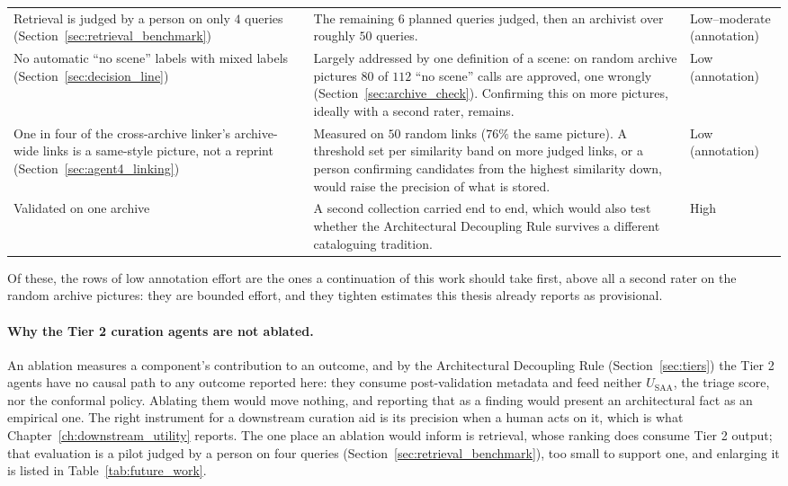 \documentclass[12pt,a4paper]{report}
\begin{document}
\begin{table}[!htbp]
\begin{tabular}{>{\raggedright\arraybackslash}p{3.9cm} >{\raggedright\arraybackslash}p{7.3cm} >{\raggedright\arraybackslash}p{2.2cm}}
\addlinespace
Retrieval is judged by a person on only $4$ queries (Section~\ref{sec:retrieval_benchmark}) &
The remaining $6$ planned queries judged, then an archivist over roughly $50$ queries. &
Low--moderate (annotation) \\
\addlinespace
No automatic ``no scene'' labels with mixed labels (Section~\ref{sec:decision_line}) &
Largely addressed by one definition of a scene: on random archive pictures $80$ of $112$ ``no scene'' calls are approved, one wrongly (Section~\ref{sec:archive_check}). Confirming this on more pictures, ideally with a second rater, remains. &
Low (annotation) \\
\addlinespace
One in four of the cross-archive linker's archive-wide links is a same-style picture, not a reprint (Section~\ref{sec:agent4_linking}) &
Measured on $50$ random links ($76\%$ the same picture). A threshold set per similarity band on more judged links, or a person confirming candidates from the highest similarity down, would raise the precision of what is stored. &
Low (annotation) \\
\addlinespace
Validated on one archive &
A second collection carried end to end, which would also test whether the Architectural Decoupling Rule survives a different cataloguing tradition. &
High \\
\bottomrule
\end{tabular}
\end{table}

Of these, the rows of low annotation effort are the ones a continuation of this work should take first, above all a second rater on the random archive pictures: they are bounded effort, and they tighten estimates this thesis already reports as provisional.

\paragraph{Why the Tier 2 curation agents are not ablated.} An ablation measures a component's contribution to an outcome, and by the Architectural Decoupling Rule (Section~\ref{sec:tiers}) the Tier 2 agents have no causal path to any outcome reported here: they consume post-validation metadata and feed neither $U_{\text{SAA}}$, the triage score, nor the conformal policy. Ablating them would move nothing, and reporting that as a finding would present an architectural fact as an empirical one. The right instrument for a downstream curation aid is its precision when a human acts on it, which is what Chapter~\ref{ch:downstream_utility} reports. The one place an ablation would inform is retrieval, whose ranking does consume Tier 2 output; that evaluation is a pilot judged by a person on four queries (Section~\ref{sec:retrieval_benchmark}), too small to support one, and enlarging it is listed in Table~\ref{tab:future_work}.
\end{document}

